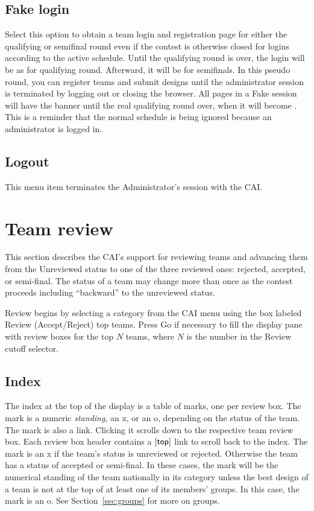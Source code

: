 \documentclass[11pt,letterpaper]{refart}
\def\ui#1{\textsf{#1}}
\begin{document}
\subsection{Fake login}
Select this option to
obtain a team login and registration page for either the qualifying or
semifinal round even if the contest is otherwise
closed for logins according to the active schedule. Until the qualifying
round is over, the login will be as for qualifying round. Afterward, it
will be for semifinals. In this
pseudo round, you can register teams and submit designs
until the administrator session is terminated by logging out or
closing the browser. All pages in a Fake session will have the banner
\ui{\color{red}{*** Admin Session: Qualifying round in progress ***}}
until the real qualifying round over, when it will become
\ui{\color{red}{*** Admin Session: Semifinals in progress
while also open for free play ***}}. This is a reminder that the
normal schedule is being ignored because an administrator is logged in.

\subsection{Logout}
This menu item terminates the Administrator's session with the CAI.

\section{Team review}
This section describes the CAI's support for reviewing teams and
advancing them from the Unreviewed status to one of the three reviewed
ones: rejected, accepted, or semi-final. The status of a team may
change more than once as the contest proceeds including ``backward''
to the unreviewed status.

Review begins by selecting a category from the CAI menu using the box
labeled \ui{Review (Accept/Reject) top teams}. Press \ui{Go} if
necessary to fill the display pane with review boxes for the top $N$
teams, where $N$ is the number in the \ui{Review cutoff} selector.

\subsection{Index}
The index at the top of the display is a table of marks, one per
review box. The mark is a numeric \emph{standing}, an \ui{x}, or an
\ui{o}, depending on the status of the team. The mark is also a
link. Clicking it scrolls down to the respective team review box. Each
review box header contains a $[\hbox{\ui{top}}]$ link to scroll back
to the index. The mark is an \ui{x} if the team's status is unreviewed
or rejected. Otherwise the team has a status of accepted or
semi-final. In these cases, the mark will be the numerical standing of
the team nationally in its category unless the best design of a team
is not at the top of at least one of its members' groups. In this case,
the mark is an \ui{o}. See Section~\ref{sec:groups} for more on groups.
\end{document}

